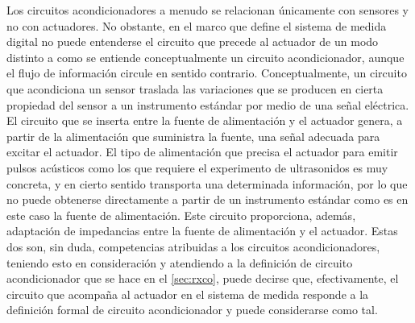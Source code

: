 Los circuitos acondicionadores a menudo se relacionan únicamente con
sensores y no con actuadores. No obstante, en el marco que define el
sistema de medida digital no puede entenderse el circuito que precede al
actuador de un modo distinto a como se entiende conceptualmente un circuito
acondicionador, aunque el flujo de información circule en sentido
contrario. Conceptualmente, un circuito que acondiciona un sensor traslada
las variaciones que se producen en cierta propiedad del sensor a un
instrumento estándar por medio de una señal eléctrica. El circuito que se
inserta entre la fuente de alimentación y el actuador genera, a partir de
la alimentación que suministra la fuente, una señal adecuada para excitar
el actuador. El tipo de alimentación que precisa el actuador para emitir
pulsos acústicos como los que requiere el experimento de ultrasonidos es
muy concreta, y en cierto sentido transporta una determinada información,
por lo que no puede obtenerse directamente a partir de un instrumento
estándar como es en este caso la fuente de alimentación. Este circuito
proporciona, además, adaptación de impedancias entre la fuente de
alimentación y el actuador. Estas dos son, sin duda, competencias
atribuidas a los circuitos acondicionadores, teniendo esto en consideración
y atendiendo a la definición de circuito acondicionador que se hace en el
\cref{sec:rxco}, puede decirse que, efectivamente, el circuito que acompaña
al actuador en el sistema de medida responde a la definición formal de
circuito acondicionador y puede considerarse como tal.

